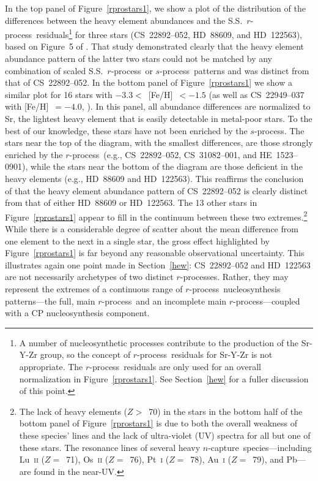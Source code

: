 \documentclass{emulateapj}
\def\rpro{\mbox{$r$-process}}
\def\spro{\mbox{$s$-process}}
\def\ncap{\mbox{$n$-capture}}
\begin{document}
In the top panel of Figure~\ref{rprostars1}, we 
show a plot of the distribution of
the differences between the heavy element abundances and the S.S.\ 
\rpro\ residuals\footnote{
A number of nucleosynthetic processes contribute to the
production of the Sr-Y-Zr group, 
so the concept of \rpro\ residuals for Sr-Y-Zr is not appropriate.
The \rpro\ residuals are only used for an overall normalization
in Figure~\ref{rprostars1}.
See Section~\ref{hew} for a
fuller discussion of this point.}
for three stars (\mbox{CS~22892--052}, \mbox{HD~88609}, 
and \mbox{HD~122563}), based on Figure~5 of \citet{honda07}.
That study demonstrated clearly that the heavy element abundance pattern 
of the latter two stars
could not be matched by any combination of scaled S.S.\ 
\rpro\ or \spro\ patterns and was distinct from that of 
\mbox{CS~22892--052}.
In the bottom panel of 
Figure~\ref{rprostars1} we show a similar plot for 16 stars with
$-3.3 <$~[Fe/H]~$< -1.5$
(as well as \mbox{CS~22949--037} with [Fe/H]~$=-4.0$, \citealt{depagne02}).
In this panel, all abundance differences are normalized to Sr, the lightest
heavy element that is easily detectable in metal-poor stars.
To the best of our knowledge, 
these stars have not been enriched by the \spro.
The stars near the top of the diagram, with the smallest differences,
are those strongly enriched by the \rpro\ (e.g., 
\mbox{CS~22892--052}, \mbox{CS~31082--001}, and \mbox{HE~1523--0901}),
while the stars near the bottom of the diagram are those
deficient in the heavy elements
(e.g., \mbox{HD~88609} and \mbox{HD~122563}).
This reaffirms the conclusion of \citet{honda07} that 
the heavy element abundance pattern of \mbox{CS~22892--052}
is clearly distinct from that of either \mbox{HD~88609} or \mbox{HD~122563}.
The 13 other stars in Figure~\ref{rprostars1} 
appear to fill in the continuum between these two extremes.\footnote{
The lack of heavy elements ($Z >$~70) in the stars in the
bottom half of the bottom panel of
Figure~\ref{rprostars1} is due to both the overall weakness
of these species' lines and the lack of ultra-violet (UV) spectra
for all but one of these stars.
The resonance lines of several heavy \ncap\ species---including 
Lu~\textsc{ii} ($Z =$~71), Os~\textsc{ii} ($Z =$~76), 
Pt~\textsc{i} ($Z =$~78), Au~\textsc{i} ($Z =$~79), 
and Pb---are found in the near-UV.
}
While there is a considerable degree of scatter about the
mean difference from one element to the next in a single star,
the gross effect highlighted by Figure~\ref{rprostars1} is far beyond
any reasonable observational uncertainty.
This illustrates again one point made in Section~\ref{hew}:
\mbox{CS~22892--052} and \mbox{HD~122563} are not necessarily
archetypes of two distinct $r$-processes.
Rather, they may represent the extremes of a continuous range of
\rpro\ nucleosynthesis patterns---the full, main \rpro\ and 
an incomplete main \rpro---coupled with a CP nucleosynthesis component.
\end{document}
